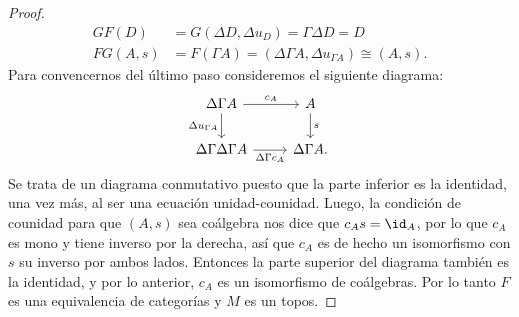\begin{proof}
  \begin{align*}
    GF(D) &= G(\Delta D, \Delta u_D) = \Gamma\Delta D = D \\
    FG(A,s) &= F(\Gamma A) = (\Delta\Gamma A, \Delta u_{\Gamma A}) \cong (A,s).
  \end{align*}
  Para convencernos del último paso consideremos el siguiente diagrama:
  \begin{equation*}
    \begin{tikzcd}
      \Delta\Gamma A\ar[swap]{d}{\Delta u_{\Gamma A}}\ar{r}{c_A} & A\ar{d}{s} \\
      \Delta\Gamma\Delta\Gamma A\ar[swap]{r}{\Delta\Gamma c_A} & \Delta\Gamma A.
    \end{tikzcd}
  \end{equation*}
  Se trata de un diagrama conmutativo puesto que la parte inferior es la identidad, 
  una vez más, al ser una ecuación unidad-counidad. Luego, la condición de counidad para que
  $(A,s)$ sea coálgebra nos dice que $c_As = \id_A$, por lo que $c_A$ es mono y tiene inverso por la derecha,
  así que $c_A$ es de hecho un isomorfismo con $s$ su inverso por ambos lados. Entonces la parte superior
  del diagrama también es la identidad, y por lo anterior, $c_A$ es un isomorfismo de coálgebras.
  Por lo tanto $F$ es una equivalencia de categorías y $M$ es un topos.
\end{proof}

